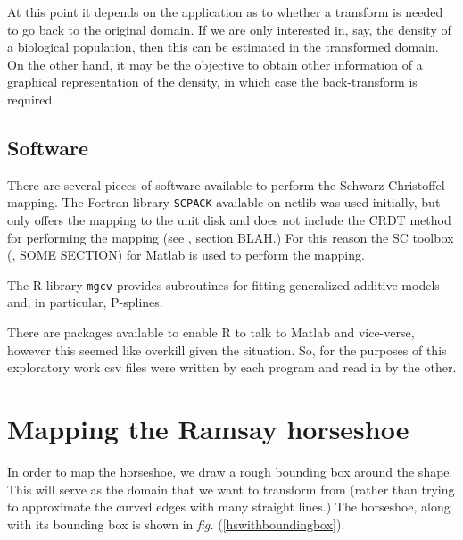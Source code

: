 \documentclass[a4paper,10pt]{amsart}
\newcommand{\sch}{Schwarz-Christoffel }
\newcommand{\fig}[1]{\emph{fig.} (\ref{#1})}
\begin{document}
At this point it depends on the application as to whether a transform is needed to go back to the original domain. If we are only interested in, say, the density of a biological population, then this can be estimated in the transformed domain. On the other hand, it may be the objective to obtain other information of a graphical representation of the density, in which case the back-transform is required.



\subsection{Software}

There are several pieces of software available to perform the \sch mapping. The Fortran library \texttt{SCPACK} available on netlib was used initially, but only offers the mapping to the unit disk and does not include the CRDT method for performing the mapping (see \cite{miller08}, section BLAH.) For this reason the SC toolbox (\cite{driscoll}, SOME SECTION) for Matlab is used to perform the mapping. 

The \textsf{R} library \texttt{mgcv} provides subroutines for fitting generalized additive models and, in particular, P-splines.

There are packages available to enable \textsf{R} to talk to Matlab and vice-verse, however this seemed like overkill given the situation. So, for the purposes of this exploratory work csv files were written by each program and read in by the other.

\section{Mapping the Ramsay horseshoe}

In order to map the horseshoe, we draw a rough bounding box around the shape. This will serve as the domain that we want to transform from (rather than trying to approximate the curved edges with many straight lines.) The horseshoe, along with its bounding box is shown in \fig{hswithboundingbox}.
\end{document}
